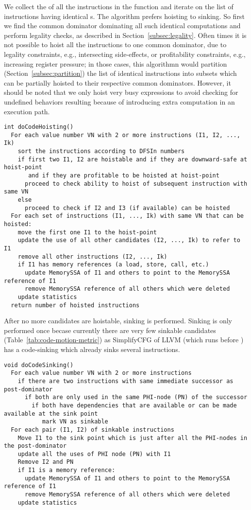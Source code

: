 \documentclass[acmlarge,review,anonymous]{acmart}\settopmatter{printfolios=true}
\begin{document}
We collect the \GVN{} of all the instructions in the function and iterate on the
list of instructions having identical \GVN{}s. The algorithm prefers hoisting to
sinking. So first we find the common dominator dominating all such identical
computations and perform legality checks, as described in
Section~\ref{subsec:legality}. Often times it is not possible to hoist all the
instructions to one common dominator, due to legality constraints, e.g.,
intersecting side-effects, or profitability constraints, e.g., increasing
register pressure; in those cases, this algorithmn would partition
(Section~\ref{subsec:partition}) the list of identical instructions into subsets
which can be partially hoisted to their respective common dominators. However,
it should be noted that we only hoist very busy expressions to avoid checking
for undefined behaviors resulting because of introducing extra computation in an
execution path.

\begin{verbatim}
int doCodeHoisting()
  For each value number VN with 2 or more instructions (I1, I2, ..., Ik)
    sort the instructions according to DFSIn numbers
    if first two I1, I2 are hoistable and if they are downward-safe at hoist-point
       and if they are profitable to be hoisted at hoist-point
      proceed to check ability to hoist of subsequent instruction with same VN
    else
      proceed to check if I2 and I3 (if available) can be hoisted
  For each set of instructions (I1, ..., Ik) with same VN that can be hoisted:
    move the first one I1 to the hoist-point
    update the use of all other candidates (I2, ..., Ik) to refer to I1
    remove all other instructions (I2, ..., Ik)
    if I1 has memory references (a load, store, call, etc.)
      update MemorySSA of I1 and others to point to the MemorySSA reference of I1
      remove MemorySSA reference of all others which were deleted
    update statistics
  return number of hoisted instructions
\end{verbatim}

After no more candidates are hoistable, sinking is performed. Sinking is only
performed once becase currently there are very few sinkable candidates
(Table~\ref{tab:code-motion-metric}) as SimplifyCFG of LLVM (which runs before
\GCM{}) has a code-sinking which already sinks several instructions.

\begin{verbatim}
void doCodeSinking()
  For each value number VN with 2 or more instructions
    if there are two instructions with same immediate successor as post-dominator
      if both are only used in the same PHI-node (PN) of the successor
        if both have dependencies that are available or can be made available at the sink point
           mark VN as sinkable
  For each pair (I1, I2) of sinkable instructions
    Move I1 to the sink point which is just after all the PHI-nodes in the post-dominator
    update all the uses of PHI node (PN) with I1
    Remove I2 and PN
    if I1 is a memory reference:
      update MemorySSA of I1 and others to point to the MemorySSA reference of I1
      remove MemorySSA reference of all others which were deleted
    update statistics
\end{verbatim}
\end{document}
